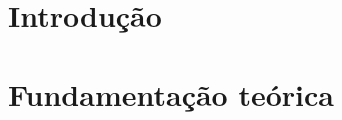 \documentclass[qualificacao, mestrado]{packages/icmc}
\begin{document}
\textual

\chapter{Introdução}
\label{cap:introducao}


\chapter{Fundamentação teórica}
\label{cap:fundamentacao}


%


% 

\postextual







\glsaddall
\printglossaries


%
\end{document}

